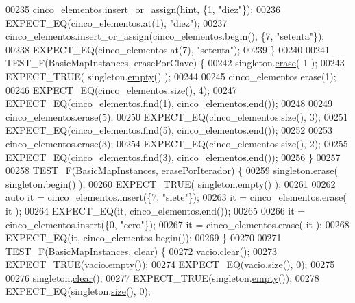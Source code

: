 \begin{DoxyCode}
00235     cinco\_elementos.insert\_or\_assign(hint, \{1, \textcolor{stringliteral}{"diez"}\});
00236     EXPECT\_EQ(cinco\_elementos.at(1), \textcolor{stringliteral}{"diez"});
00237     cinco\_elementos.insert\_or\_assign(cinco\_elementos.begin(), \{7, \textcolor{stringliteral}{"setenta"}\});
00238     EXPECT\_EQ(cinco\_elementos.at(7), \textcolor{stringliteral}{"setenta"});
00239 \}
00240 
00241 TEST\_F(BasicMapInstances, erasePorClave) \{
00242     singleton.\hyperlink{classaed2_1_1map_ad8e796bf9c9c558e5ce6b61e116253fe_ad8e796bf9c9c558e5ce6b61e116253fe}{erase}( 1 );
00243     EXPECT\_TRUE( singleton.\hyperlink{classaed2_1_1map_a0dcb39283f4877ae59cb756ed1d0c048_a0dcb39283f4877ae59cb756ed1d0c048}{empty}() );
00244 
00245     cinco\_elementos.erase(1);
00246     EXPECT\_EQ(cinco\_elementos.size(), 4);
00247     EXPECT\_EQ(cinco\_elementos.find(1), cinco\_elementos.end());
00248 
00249     cinco\_elementos.erase(5);
00250     EXPECT\_EQ(cinco\_elementos.size(), 3);
00251     EXPECT\_EQ(cinco\_elementos.find(5), cinco\_elementos.end());
00252 
00253     cinco\_elementos.erase(3);
00254     EXPECT\_EQ(cinco\_elementos.size(), 2);
00255     EXPECT\_EQ(cinco\_elementos.find(3), cinco\_elementos.end());
00256 \}
00257 
00258 TEST\_F(BasicMapInstances, erasePorIterador) \{
00259     singleton.\hyperlink{classaed2_1_1map_ad8e796bf9c9c558e5ce6b61e116253fe_ad8e796bf9c9c558e5ce6b61e116253fe}{erase}( singleton.\hyperlink{classaed2_1_1map_a58a95705d54b3dda7f775ce5a22225cb_a58a95705d54b3dda7f775ce5a22225cb}{begin}() );
00260     EXPECT\_TRUE( singleton.\hyperlink{classaed2_1_1map_a0dcb39283f4877ae59cb756ed1d0c048_a0dcb39283f4877ae59cb756ed1d0c048}{empty}() );
00261 
00262     \textcolor{keyword}{auto} it = cinco\_elementos.insert(\{7, \textcolor{stringliteral}{"siete"}\});
00263     it = cinco\_elementos.erase( it );
00264     EXPECT\_EQ(it, cinco\_elementos.end());
00265 
00266     it = cinco\_elementos.insert(\{0, \textcolor{stringliteral}{"cero"}\});
00267     it = cinco\_elementos.erase( it );
00268     EXPECT\_EQ(it, cinco\_elementos.begin());
00269 \}
00270 
00271 TEST\_F(BasicMapInstances, clear) \{
00272     vacio.clear();
00273     EXPECT\_TRUE(vacio.empty());
00274     EXPECT\_EQ(vacio.size(), 0);
00275 
00276     singleton.\hyperlink{classaed2_1_1map_a2bfa5165825979bf2431db55bc6bc9ca_a2bfa5165825979bf2431db55bc6bc9ca}{clear}();
00277     EXPECT\_TRUE(singleton.\hyperlink{classaed2_1_1map_a0dcb39283f4877ae59cb756ed1d0c048_a0dcb39283f4877ae59cb756ed1d0c048}{empty}());
00278     EXPECT\_EQ(singleton.\hyperlink{classaed2_1_1map_aa6e806b3be6dc0da79adbfae08b571bf_aa6e806b3be6dc0da79adbfae08b571bf}{size}(), 0);

\end{DoxyCode}
